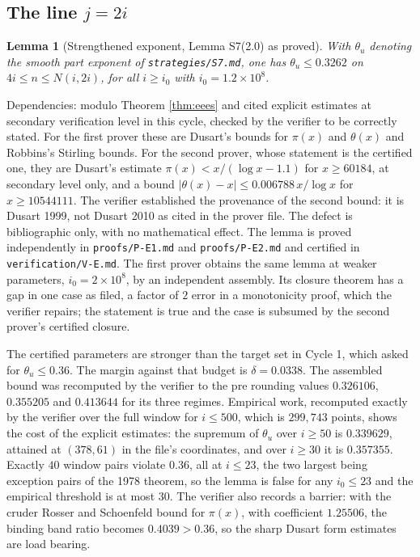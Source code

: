 \documentclass[11pt]{article}
\newtheorem{lemma}[theorem]{Lemma}
\theoremstyle{remark}
\begin{document}
\subsection{The line $j=2i$}

\begin{lemma}[Strengthened exponent, Lemma S7(2.0) as proved]
\label{lem:S7}
With $\theta_u$ denoting the smooth part exponent of \texttt{strategies/S7.md}, one has $\theta_u\le 0.3262$ on $4i\le n\le N(i,2i)$, for all $i\ge i_0$ with $i_0=1.2\times 10^8$.
\end{lemma}

Dependencies: modulo Theorem \ref{thm:eees} and cited explicit estimates at secondary verification level in this cycle, checked by the verifier to be correctly stated. For the first prover these are Dusart's bounds for $\pi(x)$ and $\theta(x)$ and Robbins's Stirling bounds. For the second prover, whose statement is the certified one, they are Dusart's estimate $\pi(x)<x/(\log x-1.1)$ for $x\ge 60184$, at secondary level only, and a bound $|\theta(x)-x|\le 0.006788\,x/\log x$ for $x\ge 10544111$. The verifier established the provenance of the second bound: it is Dusart 1999, not Dusart 2010 as cited in the prover file. The defect is bibliographic only, with no mathematical effect. The lemma is proved independently in \texttt{proofs/P-E1.md} and \texttt{proofs/P-E2.md} and certified in \texttt{verification/V-E.md}. The first prover obtains the same lemma at weaker parameters, $i_0=2\times 10^8$, by an independent assembly. Its closure theorem has a gap in one case as filed, a factor of $2$ error in a monotonicity proof, which the verifier repairs; the statement is true and the case is subsumed by the second prover's certified closure.

The certified parameters are stronger than the target set in Cycle 1, which asked for $\theta_u\le 0.36$. The margin against that budget is $\delta=0.0338$. The assembled bound was recomputed by the verifier to the pre rounding values $0.326106$, $0.355205$ and $0.413644$ for its three regimes. Empirical work, recomputed exactly by the verifier over the full window for $i\le 500$, which is $299{,}743$ points, shows the cost of the explicit estimates: the supremum of $\theta_u$ over $i\ge 50$ is $0.339629$, attained at $(378,61)$ in the file's coordinates, and over $i\ge 30$ it is $0.357355$. Exactly $40$ window pairs violate $0.36$, all at $i\le 23$, the two largest being exception pairs of the 1978 theorem, so the lemma is false for any $i_0\le 23$ and the empirical threshold is at most $30$. The verifier also records a barrier: with the cruder Rosser and Schoenfeld bound for $\pi(x)$, with coefficient $1.25506$, the binding band ratio becomes $0.4039>0.36$, so the sharp Dusart form estimates are load bearing.
\end{document}
